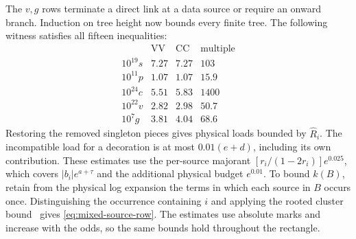 \documentclass[10pt,twocolumn]{article}
\theoremstyle{definition}
\begin{document}
The $v,g$ rows terminate a direct link at a data source or require an
onward branch. Induction on tree height now bounds every finite tree.
The following witness satisfies all fifteen inequalities:
\[
\begin{array}{c|rrr}
 &\mathrm{VV}&\mathrm{CC}&\mathrm{multiple}\\ \hline
 10^{19}s&7.27&7.27&103\\
 10^{11}p&1.07&1.07&15.9\\
 10^{24}c&5.51&5.83&1400\\
 10^{22}v&2.82&2.98&50.7\\
 10^7g&3.81&4.04&68.6
\end{array}
\]
Restoring the removed singleton pieces gives physical loads bounded
by $\widehat R_i$. The incompatible load for a decoration is at most
$0.01(e+d)$, including its own contribution. These estimates use the
per-source majorant $[r_i/(1-2r_i)]e^{0.025}$, which covers
$|b_i|e^{a+\tau}$ and the additional physical budget $e^{0.01}$.
To bound $k(B)$, retain from the physical log expansion the terms in
which each source in $B$ occurs once. Distinguishing the occurrence
containing $i$ and applying the rooted cluster bound~\cite[Thm.~1]{Uel04}
gives \eqref{eq:mixed-source-row}. The estimates use absolute marks
and increase with the odds, so the same bounds hold throughout the
rectangle.
\end{document}
